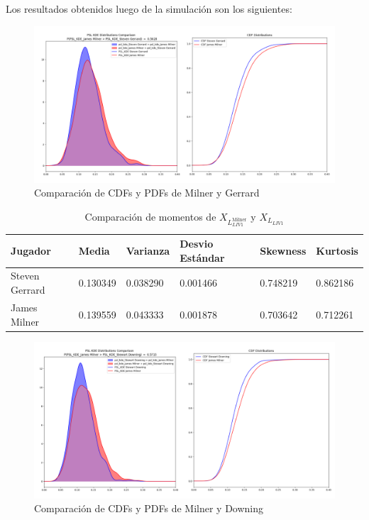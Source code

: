 \documentclass[
  a4paper,
]{article}
\begin{document}
Los resultados obtenidos luego de la simulación son los siguientes:

\begin{figure}
  \includegraphics{recursos_pdf/graficos/Milner_Gerrard.png}
    \caption{Comparación de CDFs y PDFs de Milner y Gerrard}
\end{figure}

\begin{table}
\caption{Comparación de momentos de $X_{L_{LIV1}^{\text{Milner}}}$ y $X_{L_{LIV1}}$}
\label{tab:comparacion_momentos_psl_Milner_Gerrard}
\begin{center}
\begin{tabular}{llllll}
\toprule
Jugador & Media & Varianza & Desvio Estándar & Skewness & Kurtosis \\
\midrule
Steven Gerrard &  0.130349 &  0.038290 &         0.001466 &  0.748219 &  0.862186 \\
James Milner   &  0.139559 &  0.043333 &         0.001878 &  0.703642 &  0.712261 \\
\bottomrule
\end{tabular}
\end{center}
\end{table}

\begin{figure}
  \includegraphics{recursos_pdf/graficos/Milner_Downing.png}
    \caption{Comparación de CDFs y PDFs de Milner y Downing}
\end{figure}
\end{document}
